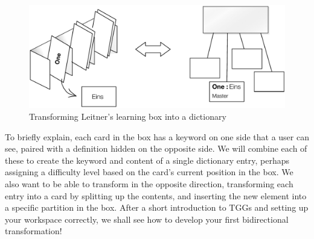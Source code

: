 \begin{figure}[htbp]
\begin{center}
  \includegraphics[width=\textwidth]{TGGTransformationExample.pdf}
  \caption{Transforming Leitner's learning box into a dictionary}
  \label{fig:transformIdea}
\end{center}
\end{figure}

To briefly explain, each card in the box has a keyword on one side that a user can see, paired with a definition hidden on the opposite side. 
We will combine each of these to create the keyword and content of a single dictionary entry, perhaps assigning a difficulty level based on the card's current position in the box. 
We also want to be able to transform in the opposite direction, transforming each entry into a card by splitting up the contents, and inserting the new element into a specific partition in the box. 
After a short introduction to TGGs and setting up your workspace correctly, we shall see how to develop
your first bidirectional transformation!


